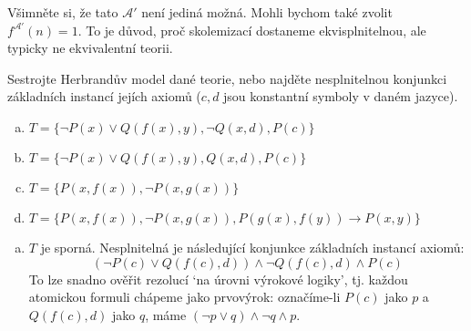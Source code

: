 \begin{problem}
\begin{solution}
\begin{enumerate}[(a)]
            Všimněte si, že tato $\mathcal A'$ není jediná možná. Mohli bychom také zvolit $f^{\mathcal A'}(n)=1$. To je důvod, proč skolemizací dostaneme ekvisplnitelnou, ale typicky ne ekvivalentní teorii.
        \end{enumerate}
    \end{solution}

\end{problem}


\begin{problem} 
    
    Sestrojte Herbrandův model dané teorie, nebo najděte nesplnitelnou konjunkci základních instancí jejích axiomů ($c,d$ jsou konstantní symboly v daném jazyce).    
    \begin{enumerate}[(a)]
        \item $T=\{\neg P(x)\vee Q(f(x),y), \neg Q(x,d), P(c)\}$
        \item $T=\{\neg P(x)\vee Q(f(x),y), Q(x,d), P(c)\}$
        \item $T=\{P(x,f(x)),\neg P(x,g(x))\}$
        \item $T=\{P(x,f(x)),\neg P(x,g(x)), P(g(x),f(y)) \to P(x,y)\}$
    \end{enumerate}

    \begin{solution}
        \begin{enumerate}[(a)]
            \item $T$ je sporná. Nesplnitelná je následující konjunkce základních instancí axiomů:
            $$
            (\neg P(c)\lor Q(f(c),d))\land \neg Q(f(c),d)\land P(c)
            $$
            To lze snadno ověřit rezolucí `na úrovni výrokové logiky', tj. každou atomickou formuli chápeme jako prvovýrok: označíme-li $P(c)$ jako $p$ a $Q(f(c),d)$ jako $q$, máme $(\neg p\lor q)\land \neg q\land p$.


\end{enumerate}
\end{solution}
\end{problem}
